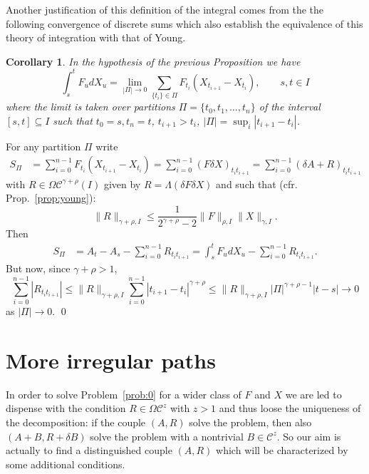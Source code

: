 \documentclass[a4paper,12pt,reqno]{amsproc}
\newcommand{\der}{\delta\!}
\newcommand{\CC}{\mathcal{C}}
\newcommand{\OCC}{\Omega \mathcal{C}}
\newcommand{\norm}[1]{\lVert #1\rVert}
\newtheorem{corollary}{Corollary}
\begin{document}
\medskip
Another justification of this definition of the integral comes
from the the following convergence of discrete sums which also
establish the equivalence of this theory of integration with that of Young.
\begin{corollary}
\label{cor:sums_young}
In the hypothesis of the previous Proposition we have
\begin{equation*}
\int_s^t F_u dX_u = \lim_{|\Pi|\to 0} \sum_{\{t_i\}\in \Pi} F_{t_i}
(X_{t_{i+1}}-X_{t_{i}}) , \qquad s,t \in I   
\end{equation*}
where the limit is taken over  partitions $\Pi = \{t_0,t_1,\dots,t_n\}$ of the interval
$[s,t] \subseteq I$ such that $t_0 = s, t_n = t$, $t_{i+1}>t_i$, $|\Pi| = \sup_i |t_{i+1}-t_i|$.
\end{corollary}
\proof
For any partition $\Pi$ write
\begin{equation*}
  \begin{split}
 S_\Pi &=  \sum_{i=0}^{n-1} F_{t_i} (X_{t_{i+1}}-X_{t_{i}}) 
= \sum_{i=0}^{n-1} (F \der X)_{t_i t_{i+1} } 
 =     \sum_{i=0}^{n-1} (\der A + R)_{t_i t_{i+1} }
  \end{split}
\end{equation*}
with $R \in \OCC^{\gamma+\rho}(I)$ given by $R = \Lambda (\der F \der
X)$ and such that (cfr. Prop.~\ref{prop:young}):
$$
\norm{R}_{\gamma+\rho,I} \le \frac{1}{2^{\gamma+\rho}-2}
\norm{F}_{\rho,I} \norm{X}_{\gamma,I}.
$$
Then
\begin{equation}
  \begin{split}
 S_\Pi & =    A_t-A_s-  \sum_{i=0}^{n-1} R_{t_i t_{i+1}}
= \int_s^t F_u dX_u -  \sum_{i=0}^{n-1} R_{t_i t_{i+1}}.
  \end{split}
\end{equation}
But now, since $\gamma+\rho>1$,
\begin{equation*}
  \sum_{i=0}^{n-1} |R_{t_i t_{i+1}}| \le \norm{R}_{\gamma+\rho,I} 
\sum_{i=0}^{n-1} |t_{i+1}-t_i|^{\gamma+\rho} \le
\norm{R}_{\gamma+\rho,I} |\Pi|^{\gamma+\rho-1} |t-s| \to 0 
\end{equation*}
as $|\Pi|\to 0$.
\qed


\section{More irregular paths}
\label{sec:irregular}
In order to solve Problem~\ref{prob:0}
for a wider class of $F$ and $X$ we are led to dispense with the condition $R
\in \OCC^{z}$ with $z > 1$ and thus loose the uniqueness of the
decomposition: if the couple $(A,R)$ solve the problem, then also $(A+B,R+\der
B)$ solve the problem with a nontrivial $B \in \CC^z$. So our aim is
actually to find a distinguished couple $(A,R)$ which will be
characterized by some additional conditions. 
\end{document}
